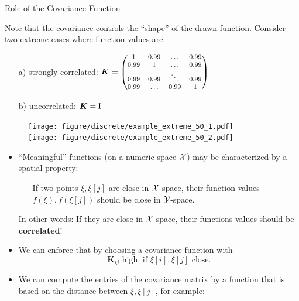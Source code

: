 \begin{vbframe}{Role of the Covariance Function}

Note that the covariance controls the \enquote{shape} of the drawn function. Consider two extreme cases where function values are

\begin{enumerate}
  \item[a)] strongly correlated: $\bm{K} = \begin{footnotesize}\begin{pmatrix} 1 & 0.99 & \dots & 0.99 \\
  0.99 & 1 & \dots & 0.99 \\
  0.99 & 0.99 & \ddots & 0.99 \\
  0.99 & \dots & 0.99 & 1 \end{pmatrix}\end{footnotesize}$
  \item[b)] uncorrelated: $\bm{K} = \mathrm{I}$
\end{enumerate}

\begin{figure}
  \texttt{[image: figure/discrete/example\_extreme\_50\_1.pdf]} ~~  \texttt{[image: figure/discrete/example\_extreme\_50\_2.pdf]}
\end{figure}


\framebreak 

\begin{itemize}
  \item \enquote{Meaningful} functions (on a numeric space $\mathcal{X}$) may be characterized by a spatial property: \vspace*{0.2cm}
  \begin{itemize}
    \item[] If two points $\xi, \xi[j]$ are close in $\mathcal{X}$-space, their function values $f(\xi), f(\xi[j])$ should be close in $\mathcal{Y}$-space. 
  \end{itemize} \vspace*{0.2cm}
  In other words: If they are close in $\mathcal{X}$-space, their functions values should be \textbf{correlated}! \vspace*{0.4cm}
  \item We can enforce that by choosing a covariance function with  
  $$
    \bm{K}_{ij} \text{ high, if } \xi[i], \xi[j] \text{ close.}
  $$

  \framebreak 

  \item We can compute the entries of the covariance matrix by a function that is based on the distance between $\xi, \xi[j]$, for example: 
  

\end{itemize}
\end{vbframe}
